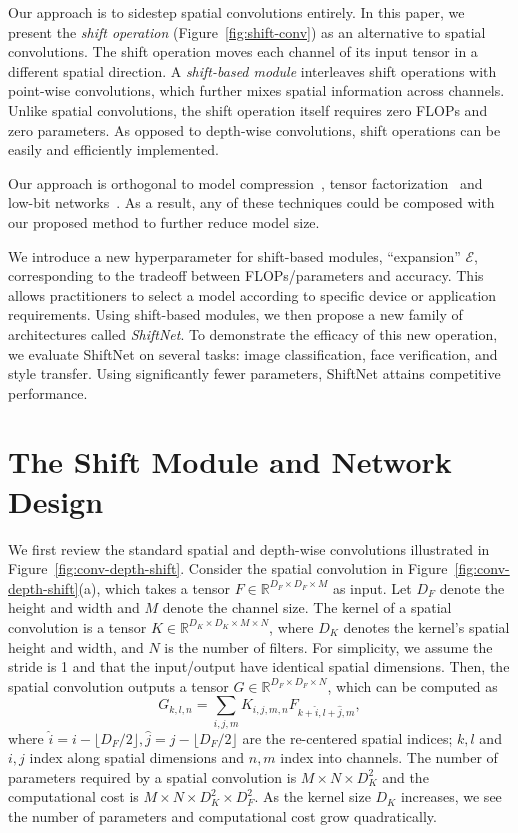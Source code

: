 \documentclass[10pt,twocolumn,letterpaper]{article}
\begin{document}
Our approach is to sidestep spatial convolutions entirely. In this paper, we present the \textit{shift operation} (Figure~\ref{fig:shift-conv}) as an alternative to spatial convolutions. 
The shift operation moves each channel of its input tensor in a different spatial direction. A \textit{shift-based module} interleaves shift operations with point-wise convolutions, which further mixes spatial information across channels. 
Unlike spatial convolutions, the shift operation itself requires zero FLOPs and zero parameters. As opposed to depth-wise convolutions, shift operations can be easily and efficiently implemented.

Our approach is orthogonal to model compression~\cite{DeepCompression}, tensor factorization~\cite{TensorFact} and low-bit networks~\cite{XnorNet}. As a result, any of these techniques could be composed with our proposed method to further reduce model size.

We introduce a new hyperparameter for shift-based modules, ``expansion'' $\mathcal{E}$, corresponding to the tradeoff between FLOPs/parameters and accuracy. This allows practitioners to select a model according to specific device or application requirements.  Using shift-based modules, we then propose a new family of architectures called \textit{ShiftNet}. To demonstrate the efficacy of this new operation, we evaluate ShiftNet on several tasks: image classification, face verification, and style transfer. Using significantly fewer parameters, ShiftNet attains competitive performance.

\section{The Shift Module and Network Design}

We first review the standard spatial and depth-wise convolutions illustrated in Figure~\ref{fig:conv-depth-shift}. Consider the spatial convolution in Figure~\ref{fig:conv-depth-shift}(a), which takes a tensor $F \in \mathbb{R}^{D_F \times D_F \times M}$ as input. Let $D_F$ denote the height and width and $M$ denote the channel size. The kernel of a spatial convolution is a tensor $K\in \mathbb{R}^{D_K \times D_K \times M \times N}$, where $D_K$ denotes the kernel's spatial height and width, and $N$ is the number of filters. For simplicity, we assume the stride is 1 and that the input/output have identical spatial dimensions. Then, the spatial convolution outputs a tensor $G \in \mathbb{R}^{D_F\times D_F \times N}$, which can be computed as
\begin{equation}
    G_{k, l, n} = \sum_{i, j, m}K_{i, j, m, n} F_{k+\hat{i},l+\hat{j}, m},
\end{equation}
where $\hat{i} = i - \lfloor D_F/2\rfloor, \hat{j} = j - \lfloor D_F/2 \rfloor$ are the re-centered spatial indices; $k, l$ and $i, j$ index along spatial dimensions and $n, m$ index into channels.
The number of parameters required by a spatial convolution is $M\times N\times D_K^2$ and the computational cost is $M\times N\times D_K^2 \times D_F^2 $. As the kernel size $D_K$ increases, we see the number of parameters and computational cost grow quadratically. 
\end{document}
